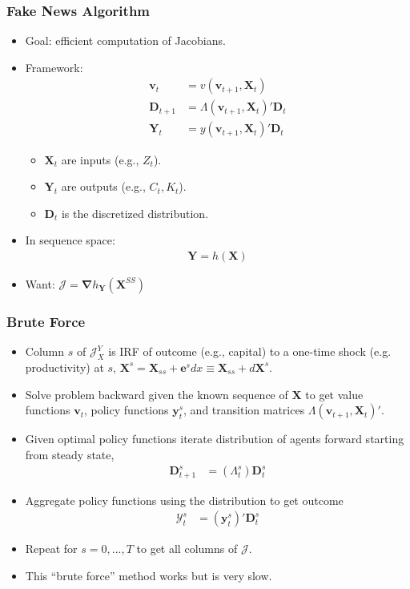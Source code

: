 \documentclass[english,xcolor=svgnames]{beamer}
\begin{document}
\begin{frame}
    \frametitle{Fake News Algorithm}
    \begin{itemize}
        \item Goal: efficient computation of Jacobians.
        \item Framework:
        \begin{align*}
        	\bm{v}_t &= v(\bm{v}_{t+1},\bm{X}_t) \\
        	\bm{D}_{t+1} &= \Lambda(\bm{v}_{t+1},\bm{X}_t)'\bm{D}_{t} \\
        	\bm{Y}_{t} &= y(\bm{v}_{t+1},\bm{X}_t)'\bm{D}_{t} 
        \end{align*}
        \begin{itemize}
        	\item $\bm{X}_t$ are inputs (e.g., $Z_t$).
        	\item $\bm{Y}_t$ are outputs (e.g., $C_t, K_t$).
        	\item $\bm{D}_t$ is the discretized distribution.
        \end{itemize}
        \item In sequence space:
        \begin{align*}
        	\bm{Y} = h(\bm{X})
        \end{align*}
        \item Want: $\mathcal{J} = \pmb\nabla h_{\bm{Y}}(\bm{X}^{SS})$
      \end{itemize}
\end{frame}

\begin{frame}
    \frametitle{Brute Force}
    \begin{itemize}
    	\item Column $s$ of $\mathcal{J}_X^Y$ is IRF of outcome (e.g., capital) to a one-time shock (e.g. productivity) at $s$, $\bm{X}^s = \bm{X}_{ss} + \bm{e}^s dx \equiv \bm{X}_{ss} + d \bm{X}^s$. 
        \item Solve problem backward given the known sequence of $\bm{X}$ to get value functions $\bm{v}_{t}$, policy functions $\bm{y}_t^s$, and transition matrices $\Lambda(\bm{v}_{t+1},\bm{X}_t)'$.
        \item Given optimal policy functions iterate distribution of agents forward starting from steady state,
        \begin{align*}
    		\bm{D}_{t+1}^s &= (\Lambda_t^s) \bm{D}_t^s 
    	\end{align*}
        \item Aggregate policy functions using the distribution to get outcome
        \begin{align*}
    		\mathcal{Y}_t^s &= (\bm{y}_t^s)'\bm{D}_t^s 
    	\end{align*}
        \item Repeat for $s=0,...,T$ to get all columns of $\mathcal{J}$.
        \item This ``brute force'' method works but is very slow.
    \end{itemize}
\end{frame}
\end{document}

